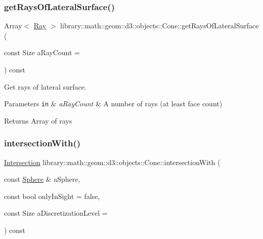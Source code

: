 \subsubsection{\texorpdfstring{get\+Rays\+Of\+Lateral\+Surface()}{getRaysOfLateralSurface()}}
{\footnotesize\ttfamily Array$<$ \hyperlink{classlibrary_1_1math_1_1geom_1_1d3_1_1objects_1_1_ray}{Ray} $>$ library\+::math\+::geom\+::d3\+::objects\+::\+Cone\+::get\+Rays\+Of\+Lateral\+Surface (\begin{DoxyParamCaption}\item[{const Size}]{a\+Ray\+Count = {} }\end{DoxyParamCaption}) const}



Get rays of lateral surface. 


\begin{DoxyParams}[1]{Parameters}
\mbox{\tt in}  & {\em a\+Ray\+Count} & A number of rays (at least face count) \\
\hline
\end{DoxyParams}
\begin{DoxyReturn}{Returns}
Array of rays 
\end{DoxyReturn}
\mbox{\label{classlibrary_1_1math_1_1geom_1_1d3_1_1objects_1_1_cone_ab49a0077e48c73a22726ecededf5553a}} 
\subsubsection{\texorpdfstring{intersection\+With()}{intersectionWith()}\hspace{0.1cm}{\footnotesize\ttfamily [1/2]}}
{\footnotesize\ttfamily \hyperlink{classlibrary_1_1math_1_1geom_1_1d3_1_1_intersection}{Intersection} library\+::math\+::geom\+::d3\+::objects\+::\+Cone\+::intersection\+With (\begin{DoxyParamCaption}\item[{const \hyperlink{classlibrary_1_1math_1_1geom_1_1d3_1_1objects_1_1_sphere}{Sphere} \&}]{a\+Sphere,  }\item[{const bool}]{only\+In\+Sight = {\ttfamily false},  }\item[{const Size}]{a\+Discretization\+Level = {} }\end{DoxyParamCaption}) const}




